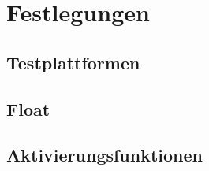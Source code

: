 
\section{Festlegungen}

\subsection{Testplattformen}

\newpage

\subsection{Float}

\newpage

\subsection{Aktivierungsfunktionen}

\newpage